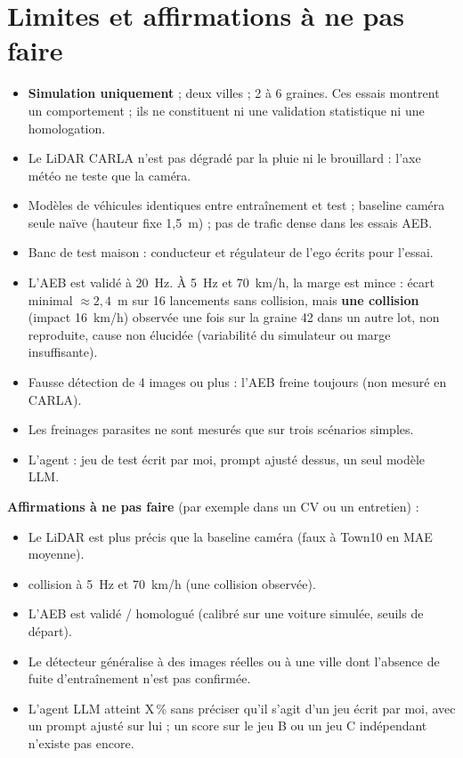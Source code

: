 \documentclass[11pt,a4paper]{article}
\providecommand{\og}{\guillemotleft\nobreakspace}
\providecommand{\fg}{\nobreakspace\guillemotright}
\begin{document}
\section{Limites et affirmations \`a ne pas faire}
\begin{limite}
\begin{itemize}
\item \textbf{Simulation uniquement} ; deux villes ; 2 \`a 6 graines. Ces essais montrent un comportement ; ils ne constituent ni une validation statistique ni une homologation.
\item Le LiDAR CARLA n'est pas d\'egrad\'e par la pluie ni le brouillard : l'axe m\'et\'eo ne teste que la cam\'era.
\item Mod\`eles de v\'ehicules identiques entre entra\^inement et test ; baseline cam\'era seule na\"ive (hauteur fixe 1,5~m) ; pas de trafic dense dans les essais AEB.
\item Banc de test maison : conducteur et r\'egulateur de l'ego \'ecrits pour l'essai.
\item L'AEB est valid\'e \`a 20~Hz. \`A 5~Hz et 70~km/h, la marge est mince : \'ecart minimal $\approx2{,}4$~m sur 16 lancements sans collision, mais \textbf{une collision} (impact 16~km/h) observ\'ee une fois sur la graine 42
      dans un autre lot, non reproduite, cause non \'elucid\'ee (variabilit\'e du simulateur ou marge insuffisante).
\item Fausse d\'etection de 4 images ou plus : l'AEB freine toujours (non mesur\'e en CARLA).
\item Les freinages parasites ne sont mesur\'es que sur trois sc\'enarios simples.
\item L'agent : jeu de test \'ecrit par moi, prompt ajust\'e dessus, un seul mod\`ele LLM.
\end{itemize}
\end{limite}
\textbf{Affirmations \`a ne pas faire} (par exemple dans un CV ou un entretien) :
\begin{itemize}
\item \og Le LiDAR est plus pr\'ecis que la baseline cam\'era \fg{} (faux \`a Town10 en MAE moyenne).
\item \og 0 collision \`a 5~Hz et 70~km/h \fg{} (une collision observ\'ee).
\item \og L'AEB est valid\'e / homologu\'e \fg{} (calibr\'e sur une voiture simul\'ee, seuils de d\'epart).
\item \og Le d\'etecteur g\'en\'eralise \fg{} \`a des images r\'eelles ou \`a une ville dont l'absence de fuite d'entra\^inement n'est pas confirm\'ee.
\item \og L'agent LLM atteint X\,\% \fg{} sans pr\'eciser qu'il s'agit d'un jeu \'ecrit par moi, avec un prompt ajust\'e sur lui ; un score sur le jeu B ou un jeu C ind\'ependant n'existe pas encore.
\end{itemize}
\end{document}
